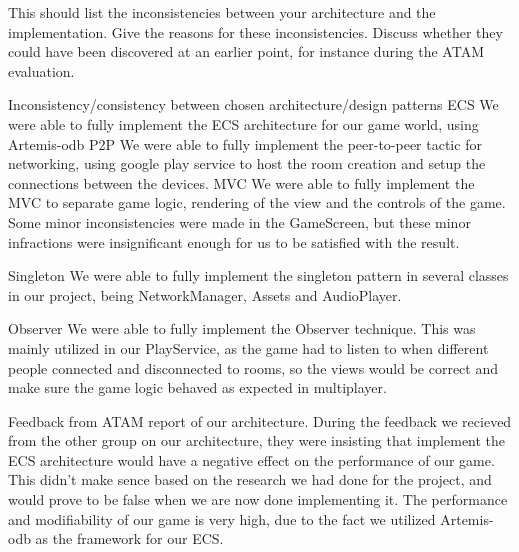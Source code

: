 
This should list the inconsistencies between your architecture and the implementation.
Give the reasons for these inconsistencies. Discuss whether they could have been discovered at an earlier point, for instance during the ATAM evaluation.




Inconsistency/consistency between chosen architecture/design patterns
ECS
We were able to fully implement the ECS architecture for our game world, using Artemis-odb
P2P
We were able to fully implement the peer-to-peer tactic for networking, using google play service to host the room creation and setup the connections between the devices.
MVC
We were able to fully implement the MVC to separate game logic, rendering of the view and the controls of the game. Some minor inconsistencies were made in the GameScreen, but these minor infractions were insignificant enough for us to be satisfied with the result.

Singleton
We were able to fully implement the singleton pattern in several classes in our project, being NetworkManager, Assets and AudioPlayer.


Observer
We were able to fully implement the Observer technique. This was mainly utilized in our PlayService, as the game had to listen to when different people connected and disconnected to rooms, so the views would be correct and make sure the game logic behaved as expected in multiplayer.


Feedback from ATAM report of our architecture.
During the feedback we recieved from the other group on our architecture, they were insisting that implement the ECS architecture would have a negative effect on the performance of our game. This didn’t make sence based on the research we had done for the project, and would prove to be false when we are now done implementing it. The performance and modifiability of our game is very high, due to the fact we utilized Artemis-odb as the framework for our ECS.
